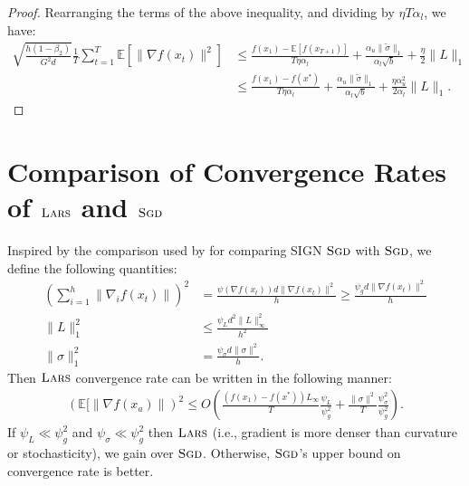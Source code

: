 \begin{proof}
Rearranging the terms of the above inequality, and dividing by $\eta T \alpha_l$, we have:
\begin{align*}
 \sqrt{\frac{h(1 - \beta_2)}{G^2 d}} \frac{1}{T} \sum_{t=1}^T \mathbb{E}[\|\nabla f(x_t)\|^2] &\leq \frac{f(x_1) - \mathbb{E}[f(x_{T+1})]}{T\eta \alpha_l} + \frac{\alpha_u \|\tilde{\sigma}\|_1}{\alpha_l\sqrt{b}} + \frac{\eta}{2} \| L\|_1 \\
&\leq \frac{f(x_1) - f(x^*)}{T\eta \alpha_l} + \frac{\alpha_u\|\tilde{\sigma}\|_1}{\alpha_l\sqrt{b}} + \frac{\eta \alpha_u^2}{2\alpha_l} \| L\|_1.
\end{align*}
\end{proof}


\section{Comparison of Convergence Rates of $\textsc{Lars}$ and $\textsc{Sgd}$}
\label{sec:conv-compare}

Inspired by the comparison used by \citep{signsgd} for comparing SIGN $\textsc{Sgd}$ with $\textsc{Sgd}$, we define the following quantities:
\begin{align*}
\left(\sum_{i=1}^h \|\nabla_i f(x_t)\|\right)^2 &=  \frac{\psi(\nabla f(x_t))d \|\nabla f(x_t)\|^2}{h} \geq \frac{\psi_g d \|\nabla f(x_t)\|^2}{h} \\
\|L\|_1^2 &\leq  \frac{\psi_L d^2 \|L\|_\infty^2}{h^2} \\
\|\sigma\|_1^2 &=  \frac{\psi_\sigma d \|\sigma\|^2}{h}.
\end{align*}
Then $\textsc{Lars}$ convergence rate can be written in the following manner:
\begin{align*}
\left(\mathbb{E}[\|\nabla f(x_a)\|\right)^2 \leq O\left(\frac{(f(x_1) - f(x^*)) L_\infty}{T}  \frac{\psi_L}{\psi_g^2}+ \frac{\|\sigma \|^2}{T} \frac{\psi_\sigma^2}{\psi_g^2}\right).
\end{align*}
If $\psi_L \ll \psi_g^2$ and $\psi_\sigma \ll \psi_g^2$ then $\textsc{Lars}$ (i.e., gradient is more denser than curvature or stochasticity), we gain over $\textsc{Sgd}$. Otherwise, $\textsc{Sgd}$'s upper bound on convergence rate is better.


